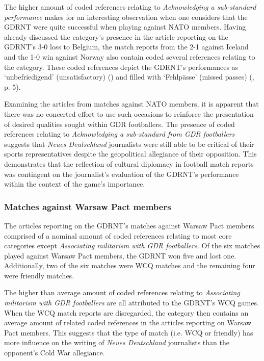 The higher amount of coded references relating to \textit{Acknowledging a sub-standard performance} makes for an interesting observation when one considers that the GDRNT were quite successful when playing against NATO members. Having already discussed the category’s presence in the article reporting on the GDRNT’s 3-0 loss to Belgium, the match reports from the 2-1 against Iceland and the 1-0 win against Norway also contain coded several references relating to the category. These coded references depict the GDRNT’s performances as ‘unbefriedigend’ (unsatisfactory) (\cite{nd19740524}) and filled with ‘Fehlpässe’ (missed passes) (\cite{nd19730719}, p. 5).

Examining the articles from matches against NATO members, it is apparent that there was no concerted effort to use such occasions to reinforce the presentation of desired qualities sought within GDR footballers. The presence of coded references relating to \textit{Acknowledging a sub-standard from GDR footballers} suggests that \textit{Neues Deutschland} journalists were still able to be critical of their sports representatives despite the geopolitical allegiance of their opposition. This demonstrates that the reflection of cultural diplomacy in football match reports was contingent on the journalist’s evaluation of the GDRNT’s performance within the context of the game’s importance.

\subsubsection*{Matches against Warsaw Pact members}

The articles reporting on the GDRNT’s matches against Warsaw Pact members comprised of a nominal amount of coded references relating to most core categories except \textit{Associating militarism with GDR footballers}. Of the six matches played against Warsaw Pact members, the GDRNT won five and lost one. Additionally, two of the six matches were WCQ matches and the remaining four were friendly matches.

The higher than average amount of coded references relating to \textit{Associating militarism with GDR footballers} are all attributed to the GDRNT’s WCQ games. When the WCQ match reports are disregarded, the category then contains an average amount of related coded references in the articles reporting on Warsaw Pact members. This suggests that the type of match (i.e. WCQ or friendly) has more influence on the writing of \textit{Neues Deutschland} journalists than the opponent’s Cold War allegiance.

